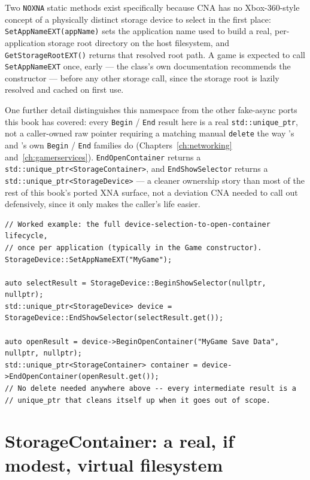 Two \texttt{NOXNA} static methods exist specifically because CNA has no Xbox-360-style
concept of a physically distinct storage device to select in the first place:
\texttt{SetAppNameEXT(appName)} sets the application name used to build a real,
per-application storage root directory on the host filesystem, and
\texttt{GetStorageRootEXT()} returns that resolved root path. A game is expected to call
\texttt{SetAppNameEXT} once, early --- the class's own documentation recommends the
 constructor --- before any other storage call, since the storage root is
lazily resolved and cached on first use.

One further detail distinguishes this namespace from the other fake-async ports this book has
covered: every \texttt{Begin} / \texttt{End} result here is a real \texttt{std::unique\_ptr}, not
a caller-owned raw pointer requiring a matching manual \texttt{delete} the way
's and 's own \texttt{Begin} / \texttt{End} families do
(Chapters~\ref{ch:networking} and~\ref{ch:gamerservices}). \texttt{EndOpenContainer} returns a
\texttt{std::unique\_ptr<StorageContainer>}, and \texttt{EndShowSelector} returns a
\texttt{std::unique\_ptr<StorageDevice>} --- a cleaner ownership story than most of the rest of
this book's ported XNA surface, not a deviation CNA needed to call out defensively, since it
only makes the caller's life easier.

\begin{lstlisting}
// Worked example: the full device-selection-to-open-container lifecycle,
// once per application (typically in the Game constructor).
StorageDevice::SetAppNameEXT("MyGame");

auto selectResult = StorageDevice::BeginShowSelector(nullptr, nullptr);
std::unique_ptr<StorageDevice> device = StorageDevice::EndShowSelector(selectResult.get());

auto openResult = device->BeginOpenContainer("MyGame Save Data", nullptr, nullptr);
std::unique_ptr<StorageContainer> container = device->EndOpenContainer(openResult.get());
// No delete needed anywhere above -- every intermediate result is a
// unique_ptr that cleans itself up when it goes out of scope.
\end{lstlisting}

\section{StorageContainer: a real, if modest, virtual filesystem}


